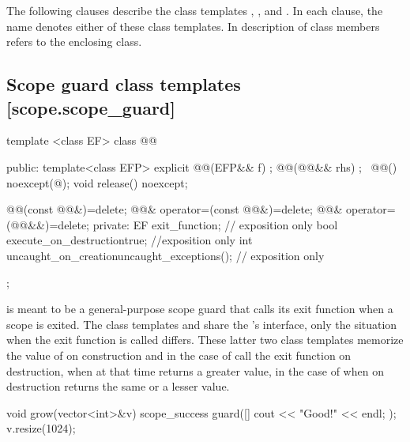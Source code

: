 \documentclass[ebook,11pt,article]{memoir}
\begin{document}
\pnum
The following clauses describe the class templates , , and . In each clause, the name  denotes either of these class templates. In description of class members  refers to the enclosing class.

\newpage
\subsection {Scope guard class templates [scope.scope_guard]}

\begin{codeblock}
template <class EF>
class @@ {
public:
  template<class EFP>
  explicit @@(EFP&& f) ;
  @@(@@&& rhs) ;
  ~@@() noexcept(@\seebelow@);
  void release() noexcept;

  @@(const @@&)=delete;
  @@& operator=(const @@&)=delete;
  @@& operator=(@@&&)=delete;
private:
  EF exit_function;    // exposition only
  bool execute_on_destruction{true}; //exposition only
  int  uncaught_on_creation{uncaught_exceptions()}; // exposition only
};

\end{codeblock}
\pnum
\begin{note}
 is meant to be a general-purpose scope guard that calls its exit function when a scope is exited. The class templates  and  share the 's interface, only the situation when the exit function is called differs. These latter two class templates memorize the value of  on construction and in the case of  call the exit function on destruction, when  at that time returns a greater value, in the case of  when  on destruction returns the same or a lesser value.\\
\begin{example}
\begin{codeblock}
void grow(vector<int>&v){
	scope_success guard([]{ cout << "Good!" << endl; });
	v.resize(1024);
}
\end{codeblock}
\end{example}
\end{note}
\end{document}
